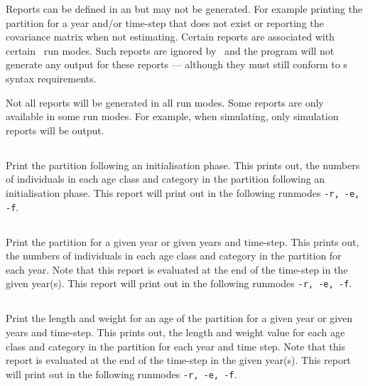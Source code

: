 Reports can be defined in an  but may not be generated. For example printing the partition for a year and/or time-step that does not exist or reporting the covariance matrix when not estimating. Certain reports are associated with certain \CNAME\ run modes. Such reports are ignored by \CNAME\ and the program will not generate any output for these reports --- although they must still conform to \CNAME s syntax requirements.

Not all reports will be generated in all run modes. Some reports are only available in some run modes. For example, when simulating, only simulation reports will be output.

\subsection{}

Print the partition following an initialisation phase. This prints out, the numbers of individuals in each age class and category in the partition following an initialisation phase. This report will print out in the following runmodes \texttt{-r, -e, -f}.

\subsection{}

Print the partition for a given year or given years and time-step. This prints out, the numbers of individuals in each age class and category in the partition for each year. Note that this report is evaluated at the end of the time-step in the given year(s). This report will print out in the following runmodes \texttt{-r, -e, -f}.


\subsection{}

Print the length and weight for an age of the partition for a given year or given years and time-step. This prints out, the length and weight value for each age class and category in the partition for each year and time step. Note that this report is evaluated at the end of the time-step in the given year(s). This report will print out in the following runmodes \texttt{-r, -e, -f}.

